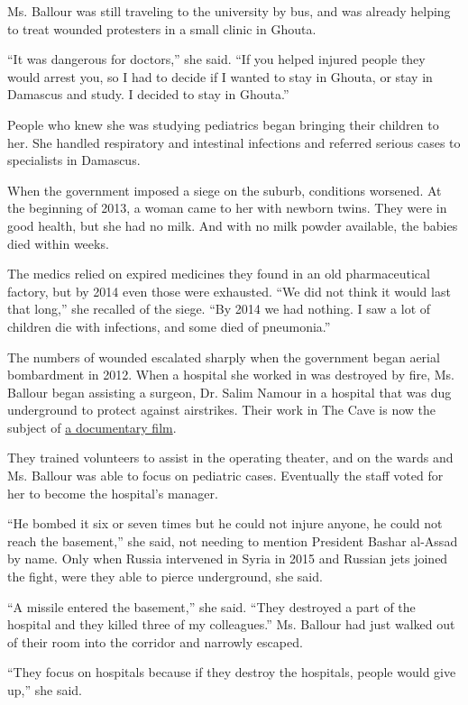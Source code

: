 Ms. Ballour was still traveling to the university by bus, and was
already helping to treat wounded protesters in a small clinic in Ghouta.

``It was dangerous for doctors,'' she said. ``If you helped injured
people they would arrest you, so I had to decide if I wanted to stay in
Ghouta, or stay in Damascus and study. I decided to stay in Ghouta.''

People who knew she was studying pediatrics began bringing their
children to her. She handled respiratory and intestinal infections and
referred serious cases to specialists in Damascus.

When the government imposed a siege on the suburb, conditions worsened.
At the beginning of 2013, a woman came to her with newborn twins. They
were in good health, but she had no milk. And with no milk powder
available, the babies died within weeks.

The medics relied on expired medicines they found in an old
pharmaceutical factory, but by 2014 even those were exhausted. ``We did
not think it would last that long,'' she recalled of the siege. ``By
2014 we had nothing. I saw a lot of children die with infections, and
some died of pneumonia.''

The numbers of wounded escalated sharply when the government began
aerial bombardment in 2012. When a hospital she worked in was destroyed
by fire, Ms. Ballour began assisting a surgeon, Dr. Salim Namour in a
hospital that was dug underground to protect against airstrikes. Their
work in The Cave is now the subject of
\href{https://www.nationalgeographic.com/films/the-cave/\#/}{a
documentary film}.

They trained volunteers to assist in the operating theater, and on the
wards and Ms. Ballour was able to focus on pediatric cases. Eventually
the staff voted for her to become the hospital's manager.

``He bombed it six or seven times but he could not injure anyone, he
could not reach the basement,'' she said, not needing to mention
President Bashar al-Assad by name. Only when Russia intervened in Syria
in 2015 and Russian jets joined the fight, were they able to pierce
underground, she said.

``A missile entered the basement,'' she said. ``They destroyed a part of
the hospital and they killed three of my colleagues.'' Ms. Ballour had
just walked out of their room into the corridor and narrowly escaped.

``They focus on hospitals because if they destroy the hospitals, people
would give up,'' she said.

